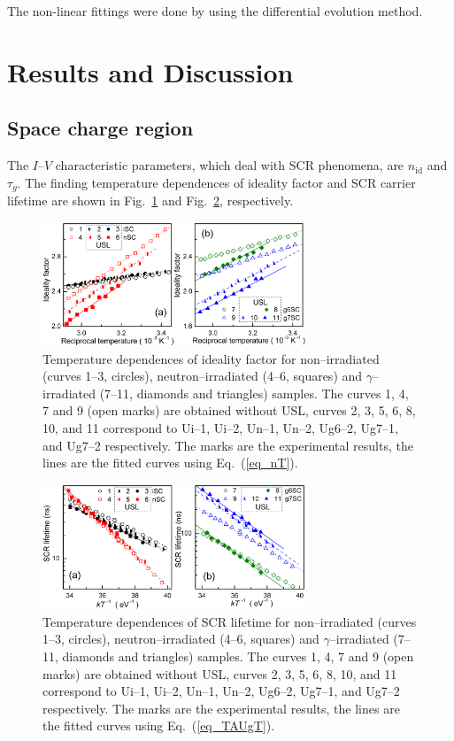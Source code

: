 \documentclass[aip,jap, amsmath,amssymb,reprint]{revtex4-1}
\begin{document}
The non-linear fittings were done by using the differential evolution method.\cite{DEWang}


\section{Results and Discussion}
\subsection{Space charge region\label{SCR}}
The $I$--$V$ characteristic parameters, which deal with SCR phenomena, are $n_{\mathrm{id}}$ and $\tau_{g}$.
The finding temperature dependences of ideality factor and SCR carrier lifetime are shown in Fig.~\ref{fig_n} and Fig.~\ref{fig_TAUg}, respectively.

\begin{figure}
\includegraphics[width=0.7\textwidth]{fig_3ab}%
\caption{\label{fig_n}
Temperature dependences of ideality factor for non--irradiated (curves 1--3, circles),
neutron--irradiated (4--6, squares) and $\gamma$--irradiated (7--11, diamonds and triangles) samples.
The curves 1, 4, 7 and 9 (open marks) are obtained without USL,
curves 2, 3, 5, 6, 8, 10, and 11 correspond to
Ui--1, Ui--2, Un--1, Un--2, Ug6--2, Ug7--1, and Ug7--2 respectively.
The marks are the experimental results, the lines are the fitted curves using Eq.~(\ref{eq_nT}).
}%
\end{figure}

\begin{figure}
\includegraphics[width=0.7\textwidth]{fig_4ab}%
\caption{\label{fig_TAUg}
Temperature dependences of SCR lifetime for non--irradiated (curves 1--3, circles),
neutron--irradiated (4--6, squares) and $\gamma$--irradiated (7--11, diamonds and triangles) samples.
The curves 1, 4, 7 and 9 (open marks) are obtained without USL,
curves 2, 3, 5, 6, 8, 10, and 11 correspond to
Ui--1, Ui--2, Un--1, Un--2, Ug6--2, Ug7--1, and Ug7--2 respectively.
The marks are the experimental results, the lines are the fitted curves using Eq.~(\ref{eq_TAUgT}).
}%
\end{figure}
\end{document}
